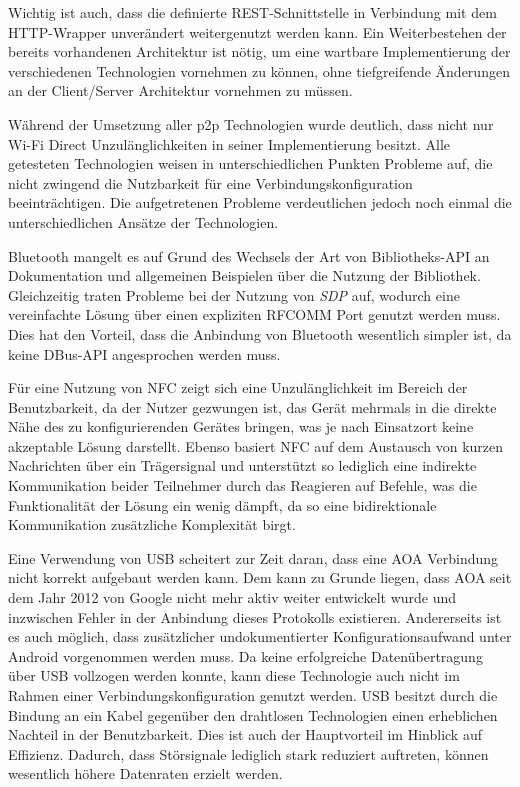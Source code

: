 Wichtig ist auch, dass die definierte REST-Schnittstelle in Verbindung mit dem HTTP-Wrapper unverändert weitergenutzt werden kann. Ein Weiterbestehen der bereits vorhandenen Architektur ist nötig, um eine wartbare Implementierung der verschiedenen Technologien vornehmen zu können, ohne tiefgreifende Änderungen an der Client/Server Architektur vornehmen zu müssen. 

Während der Umsetzung aller p2p Technologien wurde deutlich, dass nicht nur Wi-Fi Direct Unzulänglichkeiten in seiner Implementierung besitzt. Alle getesteten Technologien weisen in unterschiedlichen Punkten Probleme auf, die nicht zwingend die Nutzbarkeit für eine Verbindungskonfiguration beeinträchtigen. Die aufgetretenen Probleme verdeutlichen jedoch noch einmal die unterschiedlichen \linebreak Ansätze der Technologien.

Bluetooth mangelt es auf Grund des Wechsels der Art von Bibliotheks-API an Dokumentation und allgemeinen Beispielen über die Nutzung der Bibliothek. Gleichzeitig traten Probleme bei der Nutzung von {\it SDP} auf, wodurch eine vereinfachte Lösung über einen expliziten RFCOMM Port genutzt werden muss. Dies hat den Vorteil, dass die Anbindung von Bluetooth wesentlich simpler ist, da keine DBus-API angesprochen werden muss.

Für eine Nutzung von NFC zeigt sich eine Unzulänglichkeit im Bereich der Benutzbarkeit, da der Nutzer gezwungen ist, das Gerät mehrmals in die direkte Nähe des zu konfigurierenden Gerätes bringen, was je nach Einsatzort keine akzeptable Lösung darstellt. Ebenso basiert NFC auf dem Austausch von kurzen Nachrichten über ein Trägersignal und unterstützt so lediglich eine indirekte Kommunikation  beider Teilnehmer durch das Reagieren auf Befehle, was die Funktionalität der Lösung ein wenig dämpft, da so eine bidirektionale Kommunikation zusätzliche Komplexität birgt.

Eine Verwendung von USB scheitert zur Zeit daran, dass eine AOA Verbindung nicht korrekt aufgebaut werden kann. Dem kann zu Grunde liegen, dass AOA seit dem Jahr 2012 von Google nicht mehr aktiv weiter entwickelt wurde und inzwischen Fehler in der Anbindung dieses Protokolls existieren. Andererseits ist es auch möglich, dass zusätzlicher undokumentierter Konfigurationsaufwand unter Android vorgenommen werden muss. Da keine erfolgreiche Datenübertragung über USB vollzogen werden konnte, kann diese Technologie auch nicht im Rahmen einer Verbindungskonfiguration genutzt werden. USB besitzt durch die Bindung an ein Kabel gegenüber den drahtlosen Technologien einen erheblichen Nachteil in der Benutzbarkeit. Dies ist auch der Hauptvorteil im Hinblick auf Effizienz. Dadurch, dass Störsignale lediglich stark reduziert auftreten, können wesentlich höhere Datenraten erzielt werden.

